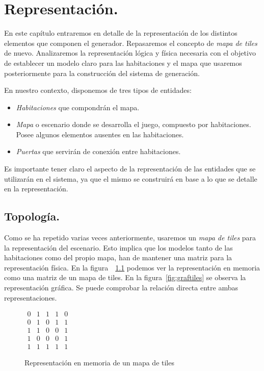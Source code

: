 \chapter{Representación.}\label{cap:capitulo3}

En este capítulo entraremos en detalle de la representación de los distintos elementos que componen el generador. Repasaremos el concepto de \emph{mapa de tiles} de nuevo. Analizaremos la representación lógica y física necesaria con el objetivo de establecer un modelo claro para las habitaciones y el mapa que usaremos posteriormente para la construcción del sistema de generación.


En nuestro contexto, disponemos de tres tipos de entidades:

\begin{itemize}
	\item \emph{Habitaciones} que compondrán el mapa.
	\item \emph{Mapa} o escenario donde se desarrolla el juego, compuesto por habitaciones. Posee algunos elementos ausentes en las habitaciones.
	\item \emph{Puertas} que servirán de conexión entre habitaciones.
\end{itemize}

Es importante tener claro el aspecto de la representación de las entidades que se utilizarán en el sistema, ya que el mismo se construirá en base a lo que se detalle en la representación.

\section{Topología.}

Como se ha repetido varias veces anteriormente, usaremos un \emph{mapa de tiles} para la representación del escenario. Esto implica que los modelos tanto de las habitaciones como del propio mapa, han de mantener una matriz para la representación física. En la figura~~\ref{fig:memtiles} podemos ver la representación en memoria como una matriz de un mapa de tiles. En la figura~\ref{fig:graftiles} se observa la representación gráfica. Se puede comprobar la relación directa entre ambas representaciones.


\begin{figure}[h]
\centering
{
	$
\begin{matrix}
	0 & 1 & 1 & 1 & 0 \\
	0 & 1 & 0 & 1 & 1 \\
	1 & 1 & 0 & 0 & 1 \\
	1 & 0 & 0 & 0 & 1 \\
	1 & 1 & 1 & 1 & 1
\end{matrix}
$
}
\caption{Representación en memoria de un mapa de tiles
\label{fig:memtiles}
}
\end{figure}

